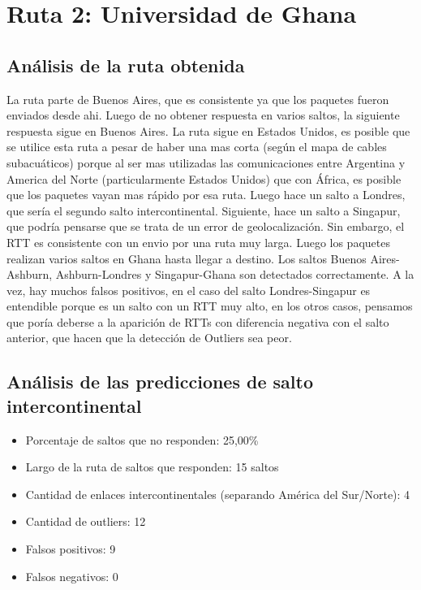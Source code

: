 \section{Ruta 2: Universidad de Ghana}
\subsection{Análisis de la ruta obtenida}

La ruta parte de Buenos Aires, que es consistente ya que los paquetes fueron enviados desde ahi. Luego de no obtener respuesta en varios saltos, la siguiente respuesta sigue en Buenos Aires.
La ruta sigue en Estados Unidos, es posible que se utilice esta ruta a pesar de haber una mas corta (según el mapa de cables subacuáticos) porque al ser mas utilizadas las comunicaciones entre Argentina y America del Norte (particularmente Estados Unidos) que con África, es posible que los paquetes vayan mas rápido por esa ruta.
Luego hace un salto a Londres, que sería el segundo salto intercontinental. Siguiente, hace un salto a Singapur, que podría pensarse que se trata de un error de geolocalización. Sin embargo, el RTT es consistente con un envio por una ruta muy larga.
Luego los paquetes realizan varios saltos en Ghana hasta llegar a destino. 
Los saltos Buenos Aires-Ashburn, Ashburn-Londres y Singapur-Ghana son detectados correctamente. A la vez, hay muchos falsos positivos, en el caso del salto Londres-Singapur es entendible porque es un salto con un RTT muy alto, en los otros casos, pensamos que poría deberse a la aparición de RTTs con diferencia negativa con el salto anterior, que hacen que la detección de Outliers sea peor.

\subsection{Análisis de las predicciones de salto intercontinental}

\begin{itemize}
	\item Porcentaje de saltos que no responden: 25,00\%
	\item Largo de la ruta de saltos que responden: 15 saltos 
	\item Cantidad de enlaces intercontinentales (separando América del Sur/Norte): 4
	\item Cantidad de outliers: 12
	\item Falsos positivos: 9
	\item Falsos negativos: 0
\end{itemize}

